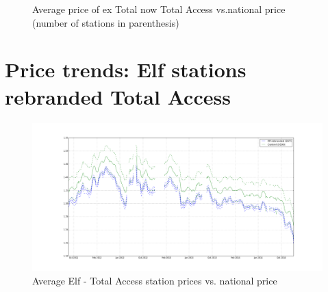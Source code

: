 \documentclass[11pt]{article}
\begin{document}
\begin{figure}[H]
    \centering
    \qquad
    \caption{Average price of ex Total now Total Access vs.national price (number of stations in parenthesis)}
    \label{fig:rebranded_before}
\end{figure}

\section{Price trends: Elf stations rebranded Total Access}

\begin{figure}[H]
	\centering
		\includegraphics[width=17cm]{graphs/elf_trend.png}
	\floatfoot{}
\caption{Average Elf - Total Access station prices vs. national price}
\label{figure:elf_prices}
\end{figure}
\end{document}
